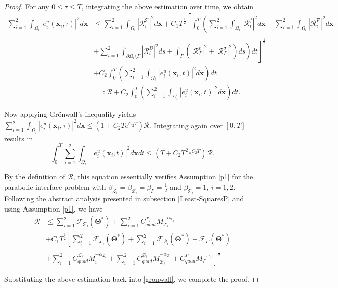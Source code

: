 \documentclass[10pt,a4paper]{amsart}
\begin{document}
\begin{proof}
For any $0 \leq \tau \leq T$, integrating the above estimation over time, we obtain
\begin{equation}
\begin{aligned}
\sum_{i=1}^{2} \int_{\Omega_i} |e^u_i(\boldsymbol{x}_i, \tau)|^2 d\boldsymbol{x} 
&\leq \sum_{i=1}^{2} \int_{\Omega_i} |\mathcal{R}^{\mathcal{T}}_i|^2 d\boldsymbol{x} + C_1 T^{\frac{1}{2}} \left[ \int_0^T \left( \sum_{i=1}^{2} \int_{\Omega_i} |\mathcal{R}^f_i|^2 d\boldsymbol{x} + \sum_{i=1}^{2} \int_{\Omega_i} |\mathcal{R}^{\nabla}_i|^2 d\boldsymbol{x} \right. \right. \\
&\left. \left. + \sum_{i=1}^{2} \int_{\partial\Omega_i \setminus \Gamma} |\mathcal{R}^{B}_i|^2 ds + \int_{\Gamma} (|\mathcal{R}^v_{\Gamma}|^2 + |\mathcal{R}^{\sigma}_{\Gamma}|^2) ds \right) dt \right]^{\frac{1}{2}} \\
&+ C_2 \int_0^T \left( \sum_{i=1}^{2} \int_{\Omega_i} |e^u_i(\boldsymbol{x}_i, t)|^2 d\boldsymbol{x} \right) dt \\
&=: \mathcal{R} + C_2 \int_0^T \left( \sum_{i=1}^{2} \int_{\Omega_i} |e^u_i(\boldsymbol{x}_i, t)|^2 d\boldsymbol{x} \right) dt.
\end{aligned}
\end{equation}

Now applying Grönwall's inequality yields $\sum_{i=1}^{2} \int_{\Omega_i} |e^u_i(\boldsymbol{x}_i, \tau)|^2 d\boldsymbol{x} \leq (1 + C_2 Te^{C_2 T})\mathcal{R}$. Integrating again over $[0, T]$ results in
\begin{equation}\label{gronwall}
\int_0^T \sum_{i=1}^{2} \int_{\Omega_i} |e^u_i(\boldsymbol{x}_i, t)|^2 d\boldsymbol{x}dt \leq (T + C_2 T^2 e^{C_2 T})\mathcal{R}.
\end{equation}

By the definition of $\mathcal{R}$, this equation essentially verifies Assumption \ref{p1} for the parabolic interface problem with $\beta_{\mathcal{L}_i} = \beta_{\mathcal{B}_i} = \beta_{\Gamma} = \frac{1}{2}$ and $\beta_{\mathcal{T}_i} = 1$, $i = 1, 2$. Following the abstract analysis presented in subsection \ref{Least-SquaresP} and using Assumption \ref{p1}, we have
\begin{equation}
\begin{aligned}
\mathcal{R} &\leq \sum_{i=1}^{2} \mathcal{F}_{\mathcal{T}_i}(\boldsymbol{\Theta}^*) + \sum_{i=1}^{2} C_{quad}^{\mathcal{T}_i}M_{\mathcal{T}_i}^{-\alpha_{\mathcal{T}_i}} \\
&+ C_1 T^{\frac{1}{2}} \left[ \sum_{i=1}^{2} \mathcal{F}_{\mathcal{L}_i}(\boldsymbol{\Theta}^*) + \sum_{i=1}^{2} \mathcal{F}_{\mathcal{B}_i}(\boldsymbol{\Theta}^*) + \mathcal{F}_{\Gamma}(\boldsymbol{\Theta}^*) \right.\\
& \left. + \sum_{i=1}^{2} C_{quad}^{\mathcal{L}_i}M_{i}^{-\alpha_{\mathcal{L}_i}} + \sum_{i=1}^{2} C_{quad}^{\mathcal{B}_i}M_{\mathcal{B}_i}^{-\alpha_{\mathcal{B}_i}} + C_{quad}^{\Gamma}M_{\Gamma}^{-\alpha_{\Gamma}} \right]^{\frac{1}{2}}
\end{aligned}
\end{equation}

Substituting the above estimation back into \eqref{gronwall}, we complete the proof.

\end{proof}
\end{document}
